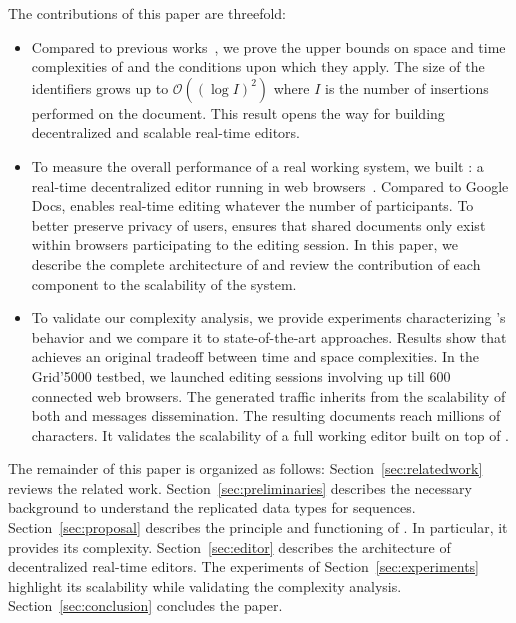 \noindent The contributions of this paper are threefold:
\begin{itemize}
\item Compared to previous works~\cite{nedelec2013concurrency,
    nedelec2013lseq}, we prove the upper bounds on space and time complexities
  of \LSEQ and the conditions upon which they apply. The size of the
identifiers grows up to $\mathcal{O}((\log I)^2)$ where $I$ is the number of
insertions performed on the document. This result opens the way
  for building decentralized and scalable real-time editors.
\item To measure the overall performance of a real working system, we built
  \CRATE: a real-time decentralized editor running in web
  browsers~\cite{nedelec2016crate}. Compared to Google Docs, \CRATE enables
  real-time editing whatever the number of participants. To better preserve
  privacy of users, \CRATE ensures that shared documents only exist within
  browsers participating to the editing session. In this paper, we describe the
  complete architecture of \CRATE and review the contribution of each component
  to the scalability of the system. %
\item To validate our complexity analysis, we provide experiments characterizing
  \LSEQ's behavior and we compare it to state-of-the-art approaches. Results
  show that \LSEQ achieves an original tradeoff between time and space
  complexities. In the Grid'5000 testbed, we launched \CRATE editing sessions
  involving up till 600 connected web browsers. The generated traffic inherits
  from the scalability of both \LSEQ and messages dissemination. The resulting
  documents reach millions of characters. It validates the scalability of a full
  working editor built on top of \LSEQ.
\end{itemize}

The remainder of this paper is organized as follows:
Section~\ref{sec:relatedwork} reviews the related work.
Section~\ref{sec:preliminaries} describes the necessary background to understand
the replicated data types for sequences. Section~\ref{sec:proposal} describes
the principle and functioning of \LSEQ. In particular, it provides its
complexity. Section~\ref{sec:editor} describes the architecture of decentralized
real-time editors. The experiments of Section~\ref{sec:experiments} highlight
its scalability while validating the complexity analysis.
Section~\ref{sec:conclusion} concludes the paper.

